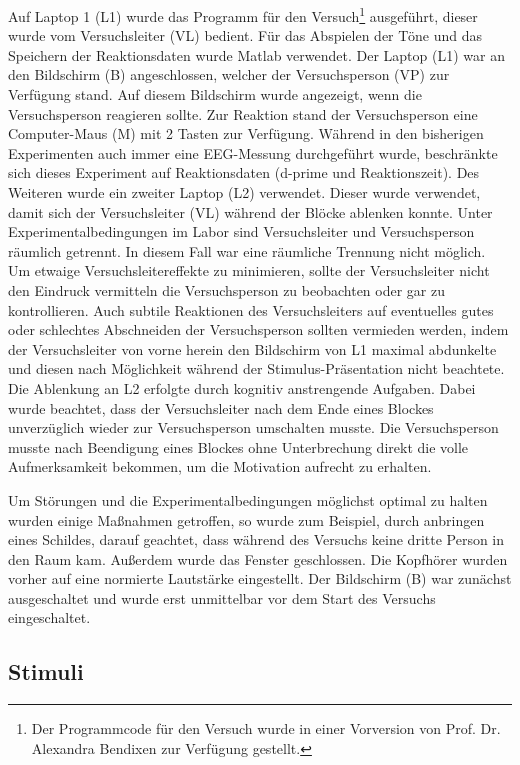 \documentclass[doc,a4paper,12pt]{apa6}
\begin{document}
Auf Laptop 1 (L1) wurde das Programm für den Versuch\footnote{\label{foot:1}Der Programmcode für den Versuch wurde in einer Vorversion von Prof. Dr. Alexandra Bendixen zur Verfügung gestellt.} ausgeführt, dieser wurde vom Versuchsleiter (VL) bedient. Für das Abspielen der Töne und das Speichern der Reaktionsdaten wurde Matlab verwendet. Der Laptop (L1) war an den Bildschirm (B) angeschlossen, welcher der Versuchsperson (VP) zur Verfügung stand. Auf diesem Bildschirm wurde angezeigt, wenn die Versuchsperson reagieren sollte. Zur Reaktion stand der Versuchsperson eine Computer-Maus (M) mit 2 Tasten zur Verfügung. Während in den bisherigen Experimenten auch immer eine EEG-Messung durchgeführt wurde, beschränkte sich dieses Experiment auf Reaktionsdaten (d-prime und Reaktionszeit). Des Weiteren wurde ein zweiter Laptop (L2) verwendet. Dieser wurde verwendet, damit sich der Versuchsleiter (VL) während der Blöcke ablenken konnte. Unter Experimentalbedingungen im Labor sind Versuchsleiter und Versuchsperson räumlich getrennt. In diesem Fall war eine räumliche Trennung nicht möglich. Um etwaige Versuchsleitereffekte zu minimieren, sollte der Versuchsleiter nicht den Eindruck vermitteln die Versuchsperson zu beobachten oder gar zu kontrollieren. Auch subtile Reaktionen des Versuchsleiters auf eventuelles gutes oder schlechtes Abschneiden der Versuchsperson sollten vermieden werden, indem der Versuchsleiter von vorne herein den Bildschirm von L1 maximal abdunkelte und diesen nach Möglichkeit während der Stimulus-Präsentation nicht beachtete. Die Ablenkung an L2 erfolgte durch kognitiv anstrengende Aufgaben. Dabei wurde beachtet, dass der Versuchsleiter nach dem Ende eines Blockes unverzüglich wieder zur Versuchsperson umschalten musste. Die Versuchsperson musste nach Beendigung eines Blockes ohne Unterbrechung direkt die volle Aufmerksamkeit bekommen, um die Motivation aufrecht zu erhalten.

Um Störungen und die Experimentalbedingungen möglichst optimal zu halten wurden einige Maßnahmen getroffen, so wurde zum Beispiel, durch anbringen eines Schildes, darauf geachtet, dass während des Versuchs keine dritte Person in den Raum kam. Außerdem wurde das Fenster geschlossen. Die Kopfhörer wurden vorher auf eine normierte Lautstärke eingestellt. Der Bildschirm (B) war zunächst ausgeschaltet und wurde erst unmittelbar vor dem Start des Versuchs eingeschaltet.

\subsection{Stimuli}
\end{document}
